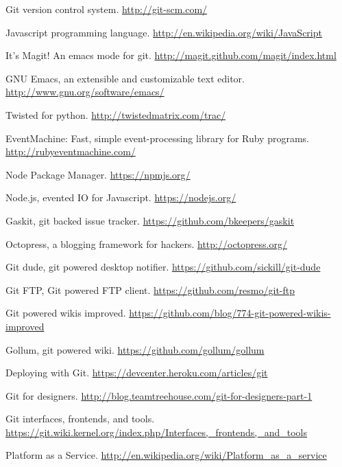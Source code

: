 \cleardoublepage
{}
{}
\begin{thebibliography}{99}

 Git version control system.
  \url{http://git-scm.com/}

 Javascript programming language.
  \url{http://en.wikipedia.org/wiki/JavaScript}

 It's Magit! An emacs mode for git.
  \url{http://magit.github.com/magit/index.html}

 GNU Emacs, an extensible and customizable text editor.
  \url{http://www.gnu.org/software/emacs/}

 Twisted for python.
  \url{http://twistedmatrix.com/trac/}

 EventMachine: Fast, simple event-processing library for
  Ruby programs. \url{http://rubyeventmachine.com/}

 Node Package Manager.
  \url{https://npmjs.org/}

 Node.js, evented IO for Javascript.
  \url{https://nodejs.org/}

 Gaskit, git backed issue tracker.
  \url{https://github.com/bkeepers/gaskit}

 Octopress, a blogging framework for hackers.
  \url{http://octopress.org/}

 Git dude, git powered desktop notifier.
  \url{https://github.com/sickill/git-dude}

 Git FTP, Git powered FTP client.
  \url{https://github.com/resmo/git-ftp}

 Git powered wikis improved.
  \url{https://github.com/blog/774-git-powered-wikis-improved}

 Gollum, git powered wiki.
  \url{https://github.com/gollum/gollum}

 Deploying with Git.
  \url{https://devcenter.heroku.com/articles/git}

 Git for designers.
  \url{http://blog.teamtreehouse.com/git-for-designers-part-1}

 Git interfaces, frontends, and tools.
  \url{https://git.wiki.kernel.org/index.php/Interfaces,_frontends,_and_tools}

 Platform as a Service.
  \url{http://en.wikipedia.org/wiki/Platform_as_a_service}


\end{thebibliography}
